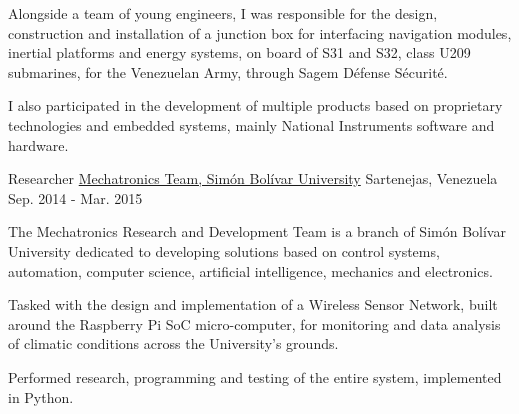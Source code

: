 \begin{cventries}
{      \begin{cvitems}
        \item {Alongside a team of young engineers, I was responsible for the design, construction and installation of a junction box for interfacing navigation modules, inertial platforms and energy systems, on board of S31 and S32, class U209 submarines, for the Venezuelan Army, through Sagem Défense Sécurité.}
        \item {I also participated in the development of multiple products based on proprietary technologies and embedded systems, mainly National Instruments software and hardware.}
      \end{cvitems} 
    }
  \cventry
    {Researcher}
    {{\href{http://www.labc.usb.ve/mecatronica/}{Mechatronics Team, Simón Bolívar University}}}
    {Sartenejas, Venezuela}
    {Sep. 2014 - Mar. 2015}
    {
    The Mechatronics Research and Development Team is a branch of Sim\'on Bol\'ivar University dedicated to developing solutions based on control systems, automation, computer science, artificial intelligence, mechanics and electronics.\vspace{4mm}
      \begin{cvitems}
        \item {Tasked with the design and implementation of a Wireless Sensor Network, built around the Raspberry Pi SoC micro-computer, for monitoring and data analysis of climatic conditions across the University's grounds.}
        \item {Performed research, programming and testing of the entire system, implemented in Python.}
      \end{cvitems}
    }
\end{cventries}
